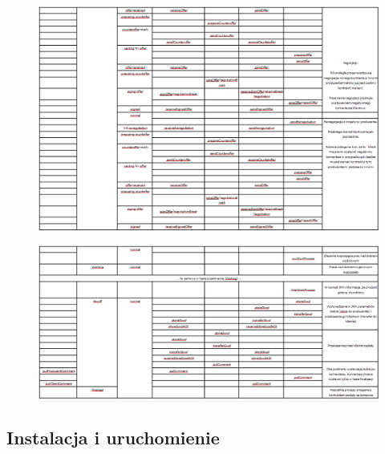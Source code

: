 \documentclass[a4paper,12pt]{article}
\begin{document}
\begin{landscape}
\begin{figure}[!h]
\centering
\includegraphics[width=24cm, keepaspectratio]{gfx/PlatformaWymianyDobr-img16.png}
\end{figure}

\begin{figure}[!h]
\centering
\includegraphics[width=24cm, keepaspectratio]{gfx/PlatformaWymianyDobr-img17.png}
\end{figure}

\end{landscape}

\newpage

\subsection{Instalacja i uruchomienie}
\end{document}
